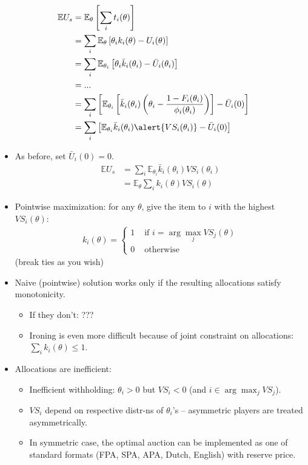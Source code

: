 \documentclass[english,handout]{beamer}		%
\def\lyxframeend{} %
\begin{document}
\begin{align*}
\mathbb{E} U_s &= \mathbb{E}_\theta \left[ \sum_i t_i(\theta) \right]
\\ &= \sum_i \mathbb{E}_{\theta} \left[ \theta_i k_i(\theta) - U_i(\theta) \right]
\\ &= \sum_i \mathbb{E}_{\theta_i} \left[ \theta_i \bar{k}_i(\theta_i) - \bar{U}_i(\theta_i) \right]
\\  &= ...
\\ &= \sum_i \left[ \mathbb{E}_{\theta_i} \left[ \bar{k}_i(\theta_i) \left( \theta_i - \frac{1-F_i(\theta_i)}{\phi_i(\theta_i)} \right) \right] - \bar{U}_i(0)\right]
\\ &= \sum_i \left[ \mathbb{E}_{\theta_i} \bar{k}_i(\theta_i) \alert{VS_i(\theta_i)} - \bar{U}_i(0) \right]
\end{align*}
\lyxframeend


\begin{itemize}
	\item As before, set $\bar{U}_i(0) = 0$.
	{\footnotesize
	\begin{align*}
		\mathbb{E} U_s &= \sum_i \mathbb{E}_{\theta_i} \bar{k}_i(\theta_i) VS_i(\theta_i)
		\\
		&= \mathbb{E}_{\theta} \sum_i k_i(\theta) VS_i(\theta)
	\end{align*}
	}
	\item Pointwise maximization: for any $\theta$, give the item to $i$ with the highest $VS_i(\theta)$:
	\begin{align*}
		k_i(\theta) = 
		\begin{cases}
			1 & \text{ if } i = \arg \max_j VS_j(\theta)
			\\
			0 & \text { otherwise}
		\end{cases}
	\end{align*}
	(break ties as you wish)
\end{itemize}
\lyxframeend


\begin{itemize}
	\item Naive (pointwise) solution works only if the resulting allocations satisfy monotonicity.
	\begin{itemize}
		\item If they don't: ???
		\item Ironing is even more difficult because of joint constraint on allocations: $\sum_i k_i (\theta) \leq 1$.
	\end{itemize}
	\item Allocations are inefficient:
	\begin{itemize}
		\item Inefficient withholding: $\theta_i > 0$ but $VS_i < 0$ (and $i \in \arg \max_j VS_j$).
		\item $VS_i$ depend on respective distr-ns of $\theta_i$'s -- asymmetric players are treated asymmetrically.
		\item In symmetric case, the optimal auction can be implemented as one of standard formats (FPA, SPA, APA, Dutch, English) with reserve price.
	\end{itemize}
\end{itemize}
\lyxframeend
\end{document}
